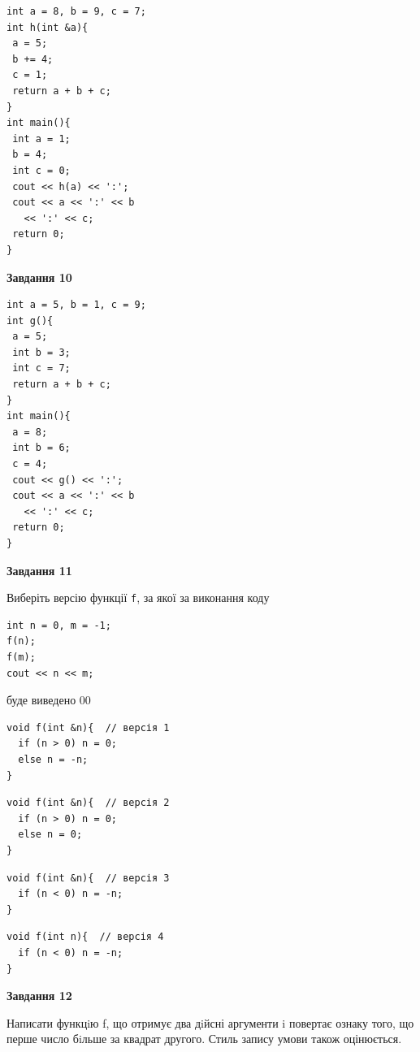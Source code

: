 \documentclass[12pt, ukrainian]{article}
\def\code#1{\Verb!#1!}
\begin{document}
{\begin {large}
\begin{minipage}[t]{7.0cm}
\begin{verbatim}
int a = 8, b = 9, c = 7;
int h(int &a){
 a = 5;
 b += 4;
 c = 1;
 return a + b + c;
}
int main(){
 int a = 1;
 b = 4;
 int c = 0;
 cout << h(a) << ':';
 cout << a << ':' << b 
   << ':' << c;
 return 0;
}
\end{verbatim}



\begin{center}
\textbf{Завдання 10}
\end{center}
\vspace{-8mm}

\begin{verbatim}
int a = 5, b = 1, c = 9;
int g(){
 a = 5;
 int b = 3;
 int c = 7;
 return a + b + c;
}
int main(){
 a = 8;
 int b = 6;
 c = 4;
 cout << g() << ':';
 cout << a << ':' << b 
   << ':' << c;
 return 0;
}
\end{verbatim}

\end{minipage}
\vline \hspace{1mm}
\begin{minipage}[t]{11.0cm}

\begin{center}
\textbf{Завдання 11}
\end{center}
Виберіть версію функції \code{f}, за якої за виконання коду
\begin{verbatim}
int n = 0, m = -1;
f(n);
f(m);
cout << n << m;
\end{verbatim}

буде виведено 00

\begin{verbatim}
void f(int &n){  // версія 1
  if (n > 0) n = 0;
  else n = -n;
}
\end{verbatim}

\vspace{-8mm}\begin{verbatim}
void f(int &n){  // версія 2
  if (n > 0) n = 0;
  else n = 0;
}
\end{verbatim}

\vspace{-8mm}\begin{verbatim}
void f(int &n){  // версія 3
  if (n < 0) n = -n;
}
\end{verbatim}

\vspace{-8mm}\begin{verbatim}
void f(int n){  // версія 4
  if (n < 0) n = -n;
}
\end{verbatim}



\begin{center}
\textbf{Завдання 12}
\end{center}

Написати функцiю f, що отримує два дiйсні аргументи i повертає ознаку того, що перше число бiльше за квадрат другого. Стиль запису умови також оцінюється.\par

\end{minipage}

\end {large}}
\newpage
\end{document}
